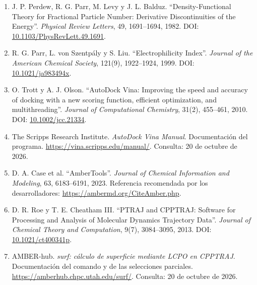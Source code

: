 \documentclass[12 pt, letter, oneside]{book}
\begin{document}
\begin{enumerate}
\item\label{anexo-ref-8} J. P. Perdew, R. G. Parr, M. Levy y J. L. Balduz. ``Density-Functional Theory for Fractional Particle Number: Derivative Discontinuities of the Energy''. \textit{Physical Review Letters}, 49, 1691--1694, 1982. DOI: \href{https://doi.org/10.1103/PhysRevLett.49.1691}{10.1103/PhysRevLett.49.1691}.

\item\label{anexo-ref-9} R. G. Parr, L. von Szentpály y S. Liu. ``Electrophilicity Index''. \textit{Journal of the American Chemical Society}, 121(9), 1922--1924, 1999. DOI: \href{https://doi.org/10.1021/ja983494x}{10.1021/ja983494x}.


\item\label{anexo-ref-10} O. Trott y A. J. Olson. ``AutoDock Vina: Improving the speed and accuracy of docking with a new scoring function, efficient optimization, and multithreading''. \textit{Journal of Computational Chemistry}, 31(2), 455--461, 2010. DOI: \href{https://doi.org/10.1002/jcc.21334}{10.1002/jcc.21334}.

\item\label{anexo-ref-11} The Scripps Research Institute. \textit{AutoDock Vina Manual}. Documentación del programa. \url{https://vina.scripps.edu/manual/}. Consulta: 20 de octubre de 2026.

\item\label{anexo-ref-12} D. A. Case et al. ``AmberTools''. \textit{Journal of Chemical Information and Modeling}, 63, 6183--6191, 2023. Referencia recomendada por los desarrolladores: \url{https://ambermd.org/CiteAmber.php}.

\item\label{anexo-ref-13} D. R. Roe y T. E. Cheatham III. ``PTRAJ and CPPTRAJ: Software for Processing and Analysis of Molecular Dynamics Trajectory Data''. \textit{Journal of Chemical Theory and Computation}, 9(7), 3084--3095, 2013. DOI: \href{https://doi.org/10.1021/ct400341p}{10.1021/ct400341p}.

\item\label{anexo-ref-14} AMBER-hub. \textit{surf: cálculo de superficie mediante LCPO en CPPTRAJ}. Documentación del comando y de las selecciones parciales. \url{https://amberhub.chpc.utah.edu/surf/}. Consulta: 20 de octubre de 2026.

\end{enumerate}
\endgroup


\fancyhead{}
\newpage
{}

\end{document}
